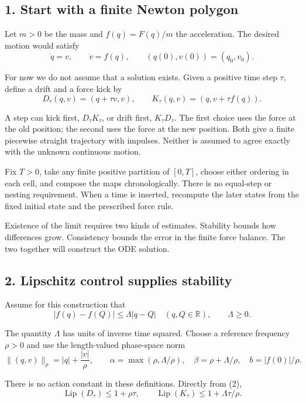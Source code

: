\documentclass[11pt,a4paper]{article}
\begin{document}
\subsection{1. Start with a finite Newton
polygon}\label{start-with-a-finite-newton-polygon}

Let \(m>0\) be the mass and \(f(q)=F(q)/m\) the acceleration. The
desired motion would satisfy
\[\dot q=v,\qquad\dot v=f(q),\qquad(q(0),v(0))=(q_0,v_0).\tag{1}\]

For now we do not assume that a solution exists. Given a positive time
step \(\tau\), define a drift and a force kick by \[
 D_\tau(q,v)=(q+\tau v,v),\qquad
 K_\tau(q,v)=(q,v+\tau f(q)).
 \tag{2}
\]

A step can kick first, \(D_\tau K_\tau\), or drift first,
\(K_\tau D_\tau\). The first choice uses the force at the old position;
the second uses the force at the new position. Both give a finite
piecewise straight trajectory with impulses. Neither is assumed to agree
exactly with the unknown continuous motion.

Fix \(T>0\), take any finite positive partition of \([0,T]\), choose
either ordering in each cell, and compose the maps chronologically.
There is no equal-step or nesting requirement. When a time is inserted,
recompute the later states from the fixed initial state and the
prescribed force rule.

Existence of the limit requires two kinds of estimates. Stability bounds
how differences grow. Consistency bounds the error in the finite force
balance. The two together will construct the ODE solution.

\subsection{2. Lipschitz control supplies
stability}\label{lipschitz-control-supplies-stability}

Assume for this construction that
\[|f(q)-f(Q)|\le\Lambda|q-Q|\quad(q,Q\in\mathbb R),\qquad\Lambda\ge0.
\tag{3}\]

The quantity \(\Lambda\) has units of inverse time squared. Choose a
reference frequency \(\rho>0\) and use the length-valued phase-space
norm \[
 \|(q,v)\|_\rho=|q|+\frac{|v|}{\rho},\qquad
 \alpha=\max(\rho,\Lambda/\rho),\quad
 \beta=\rho+\Lambda/\rho,\quad b=|f(0)|/\rho.
 \tag{4}
\]

There is no action constant in these definitions. Directly from (2), \[
 \operatorname{Lip}(D_\tau)\le1+\rho\tau,\qquad
 \operatorname{Lip}(K_\tau)\le1+\Lambda\tau/\rho.
 \tag{5}
\]
\end{document}
